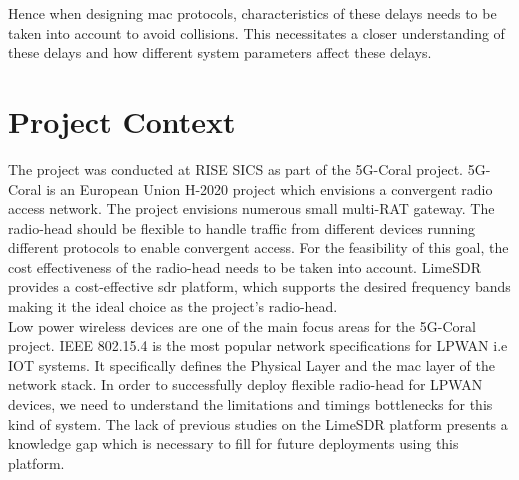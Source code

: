 Hence when designing \ac{mac} protocols, characteristics of these delays needs to be taken into account to avoid collisions.
This necessitates a closer understanding of these delays and how different system parameters affect these delays.


\section{Project Context}

The project was conducted at RISE SICS as part of the 5G-Coral project.
5G-Coral is an European Union H-2020 project which envisions a convergent radio access network.
The project envisions numerous small multi-\ac{RAT} gateway.
The radio-head should be flexible to handle traffic from different devices running different protocols to enable convergent access.
For the feasibility of this goal, the cost effectiveness of the radio-head needs to be taken into account.
LimeSDR \cite{noauthor_limesdr_nodate} provides a cost-effective \ac{sdr} platform, which supports the desired frequency bands making it the ideal choice as the project's radio-head.\\

Low power wireless devices are one of the main focus areas for the 5G-Coral project.
IEEE 802.15.4 is the most popular network specifications for \ac{LPWAN} i.e \ac{IOT} systems.
It specifically defines the Physical Layer and the \ac{mac} layer of the network stack.
In order to successfully deploy flexible radio-head for \ac{LPWAN} devices, we need to understand the limitations and timings bottlenecks for this kind of system.
The lack of previous studies on the LimeSDR platform presents a knowledge gap which is necessary to fill for future deployments using this platform.

